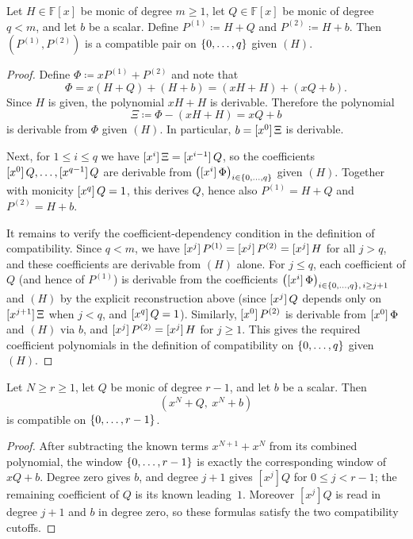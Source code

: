 \begin{lemma}\label{lem:compatible-aux-add-left}
    Let $H\in\mathbb{F}[x]$ be monic of degree $m\ge 1$, let $Q\in\mathbb{F}[x]$ be monic of degree $q<m$, and let $b$ be a scalar.
    Define $P^{(1)}\coloneqq H+Q$ and $P^{(2)}\coloneqq H+b$.
    Then $(P^{(1)},P^{(2)})$ is a compatible pair on $\idx{q}$ given $(H)$.
\end{lemma}
\begin{proof}
    Define $\Phi\coloneqq xP^{(1)}+P^{(2)}$ and note that
    \[
      \Phi = x(H+Q) + (H+b) = (xH+H) + (xQ+b).
    \]
    Since $H$ is given, the polynomial $xH+H$ is derivable.
    Therefore the polynomial
    \[
      \Xi \coloneqq \Phi-(xH+H)=xQ+b
    \]
    is derivable from $\Phi$ given $(H)$.
    In particular, $b=\coeff{\Xi}{0}$ is derivable.

    Next, for $1\le i\le q$ we have $\coeff{\Xi}{i}=\coeff{Q}{i-1}$, so the coefficients $\coeff{Q}{0},\ldots,\coeff{Q}{q-1}$ are derivable from $\bigl(\coeff{\Phi}{i}\bigr)_{i\in\idx{q}}$ given $(H)$.
    Together with monicity $\coeff{Q}{q}=1$, this derives $Q$, hence also $P^{(1)}=H+Q$ and $P^{(2)}=H+b$.

    It remains to verify the coefficient-dependency condition in the definition of compatibility.
    Since $q<m$, we have $\coeff{P^{(1)}}{j}=\coeff{P^{(2)}}{j}=\coeff{H}{j}$ for all $j>q$, and these coefficients are derivable from $(H)$ alone.
    For $j\le q$, each coefficient of $Q$ (and hence of $P^{(1)}$) is derivable from the coefficients $\bigl(\coeff{\Phi}{i}\bigr)_{i\in\idx{q},\, i\ge j+1}$ and $(H)$ by the explicit reconstruction above (since $\coeff{Q}{j}$ depends only on $\coeff{\Xi}{j+1}$ when $j<q$, and $\coeff{Q}{q}=1$).
    Similarly, $\coeff{P^{(2)}}{0}$ is derivable from $\coeff{\Phi}{0}$ and $(H)$ via $b$, and $\coeff{P^{(2)}}{j}=\coeff{H}{j}$ for $j\ge 1$.
    This gives the required coefficient polynomials in the definition of compatibility on $\idx{q}$ given $(H)$.
\end{proof}

\begin{lemma}\label{lem:compatible-low-padding}
Let $N\ge r\ge1$, let $Q$ be monic of degree $r-1$, and let $b$ be a
scalar.  Then
\[
  (x^N+Q,\ x^N+b)
\]
is compatible on $\rng r$.
\end{lemma}
\begin{proof}
After subtracting the known terms $x^{N+1}+x^N$ from its combined
polynomial, the window $\rng r$ is exactly the corresponding window of
$xQ+b$.  Degree zero gives $b$, and degree $j+1$ gives $[x^j]Q$ for
$0\le j<r-1$; the remaining coefficient of $Q$ is its known leading~$1$.
Moreover $[x^j]Q$ is read in degree $j+1$ and $b$ in degree zero, so these
formulas satisfy the two compatibility cutoffs.
\end{proof}

